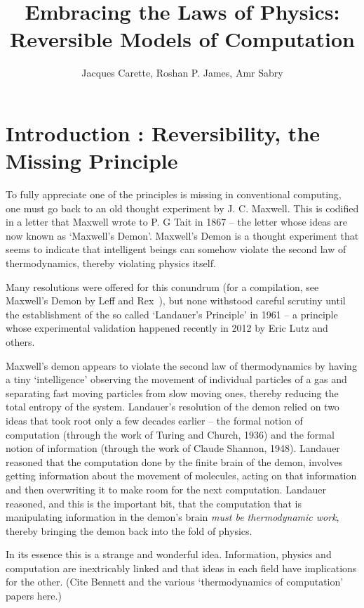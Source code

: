 \documentclass{article}
\title{Embracing the Laws of Physics: \\ Reversible Models of Computation}
\author{Jacques Carette, Roshan P. James, Amr Sabry}
\begin{document}
\maketitle

\section{Introduction : Reversibility, the Missing Principle}


To fully appreciate one of the principles is missing in conventional computing,
one must go back to an old thought experiment by J. C. Maxwell. This is
codified in a letter that Maxwell wrote to P. G Tait in 1867 -- 
the letter whose ideas are now known as `Maxwell's
Demon'. Maxwell's Demon is a thought experiment that seems to
indicate that intelligent beings can somehow violate the second law of
thermodynamics, thereby violating physics itself.

Many resolutions were offered for this conundrum (for a compilation,
see Maxwell's Demon by Leff and Rex~\cite{leff1990}), but none withstood careful
scrutiny until the establishment of the so called `Landauer's
Principle' in 1961 -- a principle whose experimental validation
happened recently in 2012 by Eric Lutz and others.

Maxwell's demon appears to violate the second law of thermodynamics by
having a tiny `intelligence' observing the movement of individual
particles of a gas and separating fast moving particles from slow
moving ones, thereby reducing the total entropy of the
system. Landauer's resolution of the demon relied on two ideas that
took root only a few decades earlier -- the formal notion of
computation (through the work of Turing and Church, 1936) and the
formal notion of information (through the work of Claude Shannon,
1948). Landauer reasoned that the computation done by the finite brain
of the demon, involves getting information about the movement of
molecules, acting on that information and then overwriting it to make
room for the next computation.  Landauer reasoned, and this is the
important bit, that the computation that is manipulating information
in the demon's brain \textit{must be thermodynamic work}, thereby
bringing the demon back into the fold of physics.

In its essence this is a strange and wonderful idea. Information,
physics and computation are inextricably linked and that ideas in each
field have implications for the other. (Cite Bennett and the various
`thermodynamics of computation' papers here.)
\end{document}
